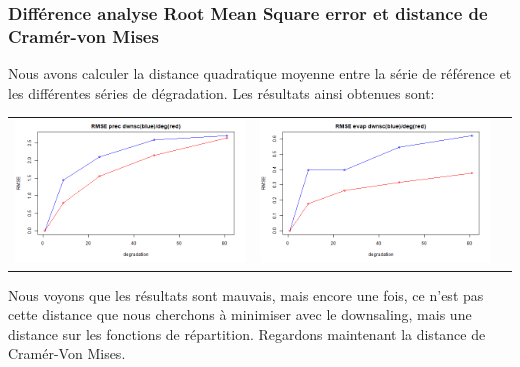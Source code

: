 \documentclass[a4paper,10pt]{article}
\begin{document}
	\subsubsection{Différence analyse Root Mean Square error et distance de Cramér-von Mises}
	
	Nous avons calculer la distance quadratique moyenne entre la série de référence et les différentes séries de dégradation. Les résultats ainsi obtenues sont:
	
	\vspace{0.5cm}
	
	\hspace{-1cm}
	\begin{tabular}{ccc}
		\includegraphics[scale=0.4]{images/RMSE_precip.png} & \includegraphics[scale=0.4]{images/RMSE_evap.png}  \\
	\end{tabular} 
	
	Nous voyons que les résultats sont mauvais, mais encore une fois, ce n'est pas cette distance que nous cherchons à minimiser avec le downsaling, mais une distance sur les fonctions de répartition. Regardons maintenant la distance de Cramér-Von Mises.
	
\end{document}
